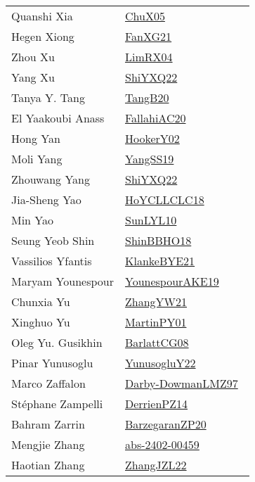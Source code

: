{\begin{longtable}{p{4cm}p{20cm}}
Quanshi Xia & \href{works/ChuX05.pdf}{ChuX05}~\cite{ChuX05}\\
Hegen Xiong & \href{works/FanXG21.pdf}{FanXG21}~\cite{FanXG21}\\
Zhou Xu & \href{works/LimRX04.pdf}{LimRX04}~\cite{LimRX04}\\
Yang Xu & \href{}{ShiYXQ22}~\cite{ShiYXQ22}\\
Tanya Y. Tang & \href{works/TangB20.pdf}{TangB20}~\cite{TangB20}\\
El Yaakoubi Anass & \href{works/FallahiAC20.pdf}{FallahiAC20}~\cite{FallahiAC20}\\
Hong Yan & \href{works/HookerY02.pdf}{HookerY02}~\cite{HookerY02}\\
Moli Yang & \href{works/YangSS19.pdf}{YangSS19}~\cite{YangSS19}\\
Zhouwang Yang & \href{}{ShiYXQ22}~\cite{ShiYXQ22}\\
Jia{-}Sheng Yao & \href{works/HoYCLLCLC18.pdf}{HoYCLLCLC18}~\cite{HoYCLLCLC18}\\
Min Yao & \href{works/SunLYL10.pdf}{SunLYL10}~\cite{SunLYL10}\\
Seung Yeob Shin & \href{works/ShinBBHO18.pdf}{ShinBBHO18}~\cite{ShinBBHO18}\\
Vassilios Yfantis & \href{works/KlankeBYE21.pdf}{KlankeBYE21}~\cite{KlankeBYE21}\\
Maryam Younespour & \href{works/YounespourAKE19.pdf}{YounespourAKE19}~\cite{YounespourAKE19}\\
Chunxia Yu & \href{works/ZhangYW21.pdf}{ZhangYW21}~\cite{ZhangYW21}\\
Xinghuo Yu & \href{works/MartinPY01.pdf}{MartinPY01}~\cite{MartinPY01}\\
Oleg Yu. Gusikhin & \href{works/BarlattCG08.pdf}{BarlattCG08}~\cite{BarlattCG08}\\
Pinar Yunusoglu & \href{works/YunusogluY22.pdf}{YunusogluY22}~\cite{YunusogluY22}\\
Marco Zaffalon & \href{works/Darby-DowmanLMZ97.pdf}{Darby-DowmanLMZ97}~\cite{Darby-DowmanLMZ97}\\
St{\'{e}}phane Zampelli & \href{works/DerrienPZ14.pdf}{DerrienPZ14}~\cite{DerrienPZ14}\\
Bahram Zarrin & \href{works/BarzegaranZP20.pdf}{BarzegaranZP20}~\cite{BarzegaranZP20}\\
Mengjie Zhang & \href{works/abs-2402-00459.pdf}{abs-2402-00459}~\cite{abs-2402-00459}\\
Haotian Zhang & \href{works/ZhangJZL22.pdf}{ZhangJZL22}~\cite{ZhangJZL22}\\

\end{longtable}}

